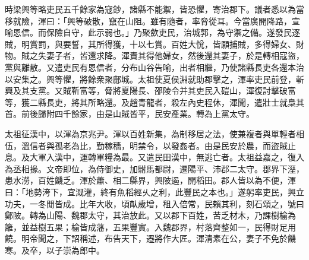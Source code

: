 \begin{pinyinscope}
 
 
 
 時梁興等略吏民五千餘家為寇鈔，諸縣不能禦，皆恐懼，寄治郡下。議者悉以為當移就險，渾曰：「興等破散，竄在山阻。雖有隨者，率脅從耳。今當廣開降路，宣喻恩信。而保險自守，此示弱也。」乃聚歛吏民，治城郭，為守禦之備。遂發民逐賊，明賞罰，與要誓，其所得獲，十以七賞。百姓大恱，皆願捕賊，多得婦女、財物。賊之失妻子者，皆還求降。渾責其得他婦女，然後還其妻子，於是轉相寇盜，黨與離散。又遣吏民有恩信者，分布山谷告喻，出者相繼，乃使諸縣長吏各還本治以安集之。興等懼，將餘衆聚鄜城。太祖使夏侯淵就助郡擊之，渾率吏民前登，斬興及其支黨。又賊靳富等，脅將夏陽長、邵陵令并其吏民入磑山，渾復討擊破富等，獲二縣長吏，將其所略還。及趙青龍者，殺左內史程休，渾聞，遣壯士就梟其首。前後歸附四千餘家，由是山賊皆平，民安產業。轉為上黨太守。
 
 
太祖征漢中，以渾為京兆尹。渾以百姓新集，為制移居之法，使兼複者與單輕者相伍，溫信者與孤老為比，勤稼穡，明禁令，以發姦者。由是民安於農，而盜賊止息。及大軍入漢中，運轉軍糧為最。又遣民田漢中，無逃亡者。太祖益嘉之，復入為丞相掾。文帝即位，為侍御史，加駙馬都尉，遷陽平、沛郡二太守。郡界下溼，患水澇，百姓饑乏。渾於蕭、相二縣界，興陂遏，開稻田。郡人皆以為不便，渾曰：「地勢洿下，宜溉灌，終有魚稻經乆之利，此豐民之本也。」遂躬率吏民，興立功夫，一冬閒皆成。比年大收，頃畒歲增，租入倍常，民賴其利，刻石頌之，號曰鄭陂。轉為山陽、魏郡太守，其治放此。又以郡下百姓，苦乏材木，乃課樹榆為籬，並益樹五果；榆皆成藩，五果豐實。入魏郡界，村落齊整如一，民得財足用饒。明帝聞之，下詔稱述，布告天下，遷將作大匠。渾清素在公，妻子不免於饑寒。及卒，以子崇為郎中。
 
 
\end{pinyinscope}